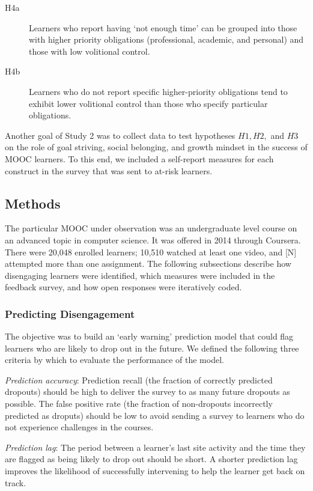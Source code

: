 \documentclass{sigchi}\usepackage[]{graphicx}\usepackage[]{color}
\begin{document}
\begin{description}
  \item[H4a] Learners who report having `not enough time' can be grouped into those with higher priority obligations (professional, academic, and personal) and those with low volitional control.
  \item[H4b] Learners who do not report specific higher-priority obligations tend to exhibit lower volitional control than those who specify particular obligations.
\end{description}  

Another goal of Study 2 was to collect data to test hypotheses $H1, H2,$ and $H3$ on the role of goal striving, social belonging, and growth mindset in the success of MOOC learners. To this end, we included a self-report measures for each construct in the survey that was sent to at-risk learners.

\subsection{Methods}

The particular MOOC under observation was an undergraduate level course on an advanced topic in computer science. It was offered in 2014 through Coursera. There were  20,048 enrolled learners; 10,510 watched at least one video, and [N] attempted more than one assignment. The following subsections describe how disengaging learners were identified, which measures were included in the feedback survey, and how open responses were iteratively coded.

\subsubsection{Predicting Disengagement}

The objective was to build an `early warning' prediction model that could flag learners who are likely to drop out in the future. We defined the following three criteria by which to evaluate the performance of the model.

\textit{Prediction accuracy}: Prediction recall (the fraction of correctly predicted dropouts) should be high to deliver the survey to as many future dropouts as possible. The false positive rate (the fraction of non-dropouts incorrectly predicted as droputs) should be low to avoid sending a survey to learners who do not experience challenges in the courses.

\textit{Prediction lag}: The period between a learner's last site activity and the time they are flagged as being likely to drop out should be short. A shorter prediction lag improves the likelihood of successfully intervening to help the learner get back on track.
\end{document}
